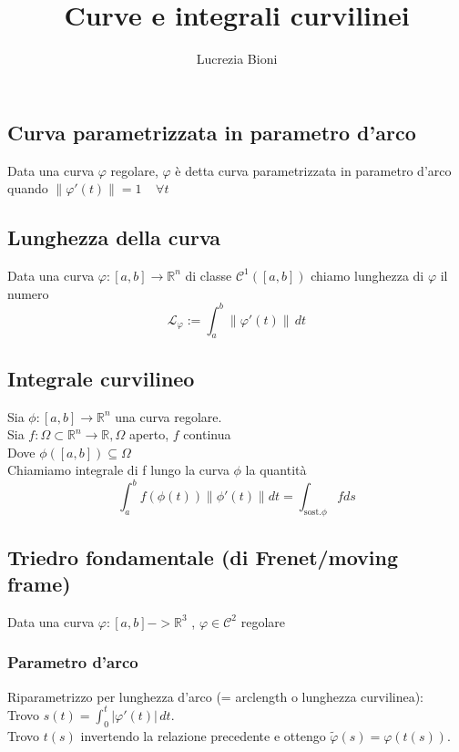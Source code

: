 \documentclass{article} %
\title{Curve e integrali curvilinei} %
\author{Lucrezia Bioni} %
\date{} %
\begin{document}
    \maketitle

    \subsection*{Curva parametrizzata in parametro d'arco}
    Data una curva $\varphi$ regolare, $\varphi$ è detta curva parametrizzata in parametro d'arco
    quando $ \| \varphi  '(t) \| = 1 \ \ \ \ \ \forall t $

    \subsection*{Lunghezza della curva}
    Data una curva $\varphi:[a,b]\to \mathbb{R} ^n $ di classe $ \mathcal{C} ^1([a,b]) $ chiamo 
    lunghezza di $\varphi$ il numero 
    $$ \mathcal{L} _\varphi := \int_{a}^{b} \| \varphi  '(t) \| \, dt  $$

    \subsection*{Integrale curvilineo}
    Sia $\phi:[a,b]\to \mathbb{R}^n$ una curva regolare. \\
    Sia $f: \Omega \subset \mathbb{R}^n \to \mathbb{R}, \Omega$ aperto, $f$ continua \\
    Dove $\phi([a,b]) \subseteq \Omega$ \\
    Chiamiamo integrale di f lungo la curva $\phi$ la quantità \\
    $$\int_{a}^{b} f(\phi(t)) \lVert \phi'(t) \rVert dt = \int_{\text{sost.}\phi} f ds $$ 

    \subsection*{Triedro fondamentale (di Frenet/moving frame)}
    Data una curva $\varphi:[a,b]->\mathbb{R} ^3$ , $\varphi \in \mathcal{C} ^2 $ regolare

    \subsubsection*{Parametro d'arco}
    Riparametrizzo per lunghezza d'arco (= arclength o lunghezza curvilinea): \\ Trovo $s(t) = \int_{0}^{t} \left| \varphi'(t) \right| \,dt $. \\ Trovo $t(s)$ invertendo la relazione precedente e ottengo $\tilde{\varphi}(s) = \varphi( t(s) )$.
    
\end{document}

